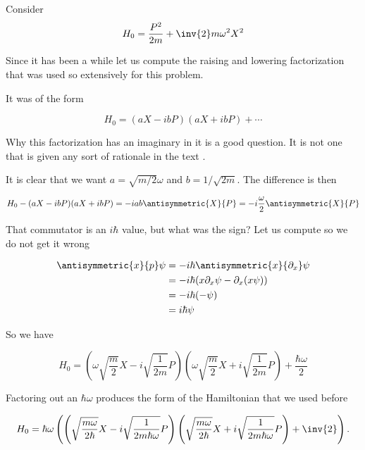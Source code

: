 \label{chap:phy456ps1SHO}

Consider
\begin{equation}\label{eqn:phy456ps1:10}
H_0 = \frac{P^2}{2m} + \inv{2} m \omega^2 X^2
\end{equation}

Since it has been a while let us compute the raising and lowering factorization that was used so extensively for this problem.

It was of the form

\begin{equation}\label{eqn:phy456ps1:30}
H_0 = (a X - i b P)(a X + i b P) + \cdots
\end{equation}

Why this factorization has an imaginary in it is a good question.  It is not one that is given any sort of rationale in the text \citep{desai2009quantum}.

It is clear that we want $a = \sqrt{m/2} \omega$ and $b = 1/\sqrt{2m}$.  The difference is then

\begin{equation}\label{eqn:phy456ps1:50}
H_0 - (a X - i b P)(a X + i b P)
=
- i a b \antisymmetric{X}{P}  = - i \frac{\omega}{2} \antisymmetric{X}{P}
\end{equation}

That commutator is an $i\hbar$ value, but what was the sign?  Let us compute so we do not get it wrong

\begin{align*}
\antisymmetric{x}{ p} \psi
&= -i \hbar \antisymmetric{x}{\partial_x} \psi \\
&= -i \hbar ( x \partial_x \psi - \partial_x (x \psi) ) \\
&= -i \hbar ( - \psi ) \\
&= i \hbar \psi
\end{align*}

So we have

\begin{equation}\label{eqn:phy456ps1:70}
H_0 =
\left(\omega \sqrt{\frac{m}{2}} X - i \sqrt{\frac{1}{2m}} P\right)\left(\omega \sqrt{\frac{m}{2}} X + i \sqrt{\frac{1}{2m}} P\right)
+ \frac{\hbar \omega}{2}
\end{equation}

Factoring out an $\hbar \omega$ produces the form of the Hamiltonian that we used before

\begin{equation}\label{eqn:phy456ps1:90}
H_0 =
\hbar \omega \left(
\left(\sqrt{\frac{m \omega}{2 \hbar}} X - i \sqrt{\frac{1}{2m \hbar \omega}} P\right)\left(\sqrt{\frac{m \omega}{2 \hbar}} X + i \sqrt{\frac{1}{2m \hbar \omega}} P\right)
+ \inv{2}
\right)
.
\end{equation}

